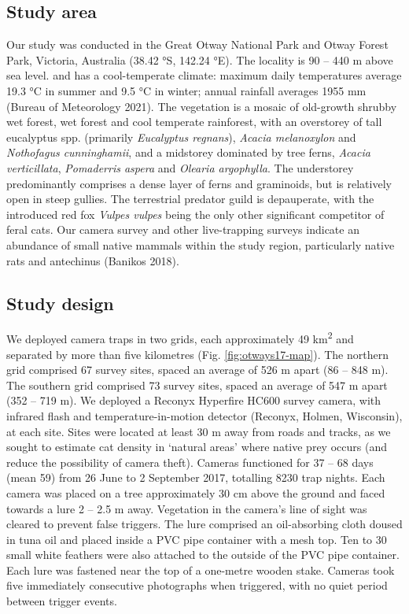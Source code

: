 \documentclass[11pt,a4paper,titlepage,twoside,openright]{style/unimelbthesis}
\begin{document}
\begin{mainmatter}
\hypertarget{study-area}{%
\subsection{Study area}\label{study-area}}

Our study was conducted in the Great Otway National Park and Otway Forest Park, Victoria, Australia (38.42 °S, 142.24 °E). The locality is 90 -- 440 m above sea level. and has a cool-temperate climate: maximum daily temperatures average 19.3 °C in summer and 9.5 °C in winter; annual rainfall averages 1955 mm (Bureau of Meteorology 2021). The vegetation is a mosaic of old-growth shrubby wet forest, wet forest and cool temperate rainforest, with an overstorey of tall eucalyptus spp. (primarily \emph{Eucalyptus regnans}), \emph{Acacia melanoxylon} and \emph{Nothofagus cunninghamii}, and a midstorey dominated by tree ferns, \emph{Acacia verticillata}, \emph{Pomaderris aspera} and \emph{Olearia argophylla}. The understorey predominantly comprises a dense layer of ferns and graminoids, but is relatively open in steep gullies. The terrestrial predator guild is depauperate, with the introduced red fox \emph{Vulpes vulpes} being the only other significant competitor of feral cats. Our camera survey and other live-trapping surveys indicate an abundance of small native mammals within the study region, particularly native rats and antechinus (Banikos 2018).

\hypertarget{study-design}{%
\subsection{Study design}\label{study-design}}

We deployed camera traps in two grids, each approximately 49 km\textsuperscript{2} and separated by more than five kilometres (Fig. \ref{fig:otways17-map}). The northern grid comprised 67 survey sites, spaced an average of 526 m apart (86 -- 848 m). The southern grid comprised 73 survey sites, spaced an average of 547 m apart (352 -- 719 m). We deployed a Reconyx Hyperfire HC600 survey camera, with infrared flash and temperature-in-motion detector (Reconyx, Holmen, Wisconsin), at each site. Sites were located at least 30 m away from roads and tracks, as we sought to estimate cat density in `natural areas' where native prey occurs (and reduce the possibility of camera theft). Cameras functioned for 37 -- 68 days (mean 59) from 26 June to 2 September 2017, totalling 8230 trap nights. Each camera was placed on a tree approximately 30 cm above the ground and faced towards a lure 2 -- 2.5 m away. Vegetation in the camera's line of sight was cleared to prevent false triggers. The lure comprised an oil-absorbing cloth doused in tuna oil and placed inside a PVC pipe container with a mesh top. Ten to 30 small white feathers were also attached to the outside of the PVC pipe container. Each lure was fastened near the top of a one-metre wooden stake. Cameras took five immediately consecutive photographs when triggered, with no quiet period between trigger events.


\end{mainmatter}
\end{document}
